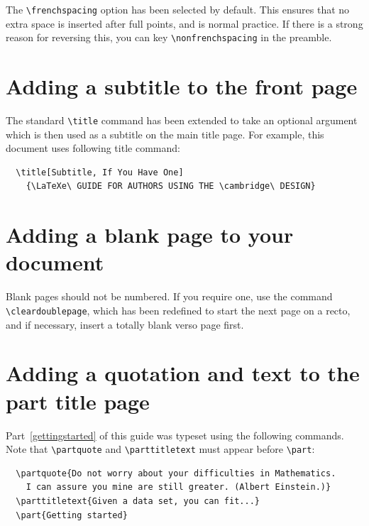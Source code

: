 The \verb"\frenchspacing" option has been selected by default. This ensures that no extra space is inserted after full points, and is normal practice. If there is a strong reason for reversing this, you can key \verb"\nonfrenchspacing" in the preamble.

\section{Adding a subtitle to the front page}

The standard \verb"\title" command has been extended to take an optional argument which is then used as a subtitle on the main title page. For example, this document uses following title command:
\begin{verbatim}
  \title[Subtitle, If You Have One]
    {\LaTeXe\ GUIDE FOR AUTHORS USING THE \cambridge\ DESIGN}
\end{verbatim}


\section{Adding a blank page to your document}

Blank pages should not be numbered. If you require one, use the command \verb"\cleardoublepage", which has been redefined to start the next page on a recto, and if necessary, insert a totally blank verso page first.

\section{Adding a quotation and text to the part title page}

Part~\ref{gettingstarted} of this guide was typeset using the following commands. Note that \verb"\partquote" and \verb"\parttitletext" must appear before \verb"\part":
\begin{verbatim}
  \partquote{Do not worry about your difficulties in Mathematics.
    I can assure you mine are still greater. (Albert Einstein.)}
  \parttitletext{Given a data set, you can fit...}
  \part{Getting started}
\end{verbatim}


